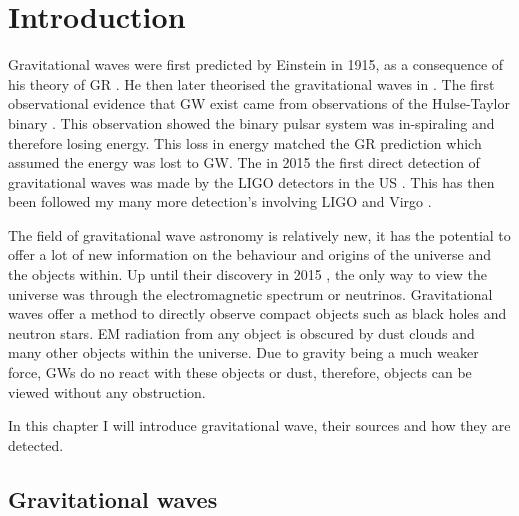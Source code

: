 \chapter{Introduction}


Gravitational waves were first predicted by Einstein in 1915, as a consequence of his theory of \ac{GR} \citep{}. He then later theorised the gravitational waves in \citep{}.
The first observational evidence that \ac{GW} exist came from observations of the Hulse-Taylor binary \citep{}. 
This observation showed the binary pulsar system was in-spiraling and therefore losing energy.
This loss in energy matched the \ac{GR} prediction which assumed the energy was lost to \ac{GW}.
The in 2015 the first direct detection of gravitational waves was made by the \ac{LIGO} detectors in the US \citep{}.
This has then been followed my many more detection's involving \ac{LIGO} and Virgo \citep{}.

The field of gravitational wave astronomy is relatively new, it has the potential to offer a lot of new information on the behaviour and origins of the universe and the objects within. 
Up until their discovery in 2015 \citep{}, the only way to view the universe was through the electromagnetic spectrum or neutrinos. 
Gravitational waves offer a method to directly observe compact objects such as black holes and neutron stars. 
\ac{EM} radiation from any object is obscured by dust clouds and many other objects within the universe.
Due to gravity being a much weaker force, \acp{GW} do no react with these objects or dust, therefore, objects can be viewed without any obstruction. 

In this chapter I will introduce gravitational wave, their sources and how they are detected. 


\section{Gravitational waves}

